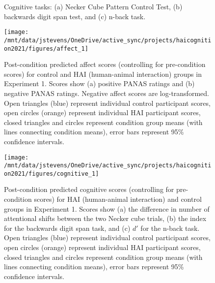 \documentclass[
  english,
  ,doc,floatsintext]{apa6}
\begin{document}
\clearpage
\newpage



\begin{figure}
\hspace{5mm}\newline{}\caption{Cognitive tasks: (a) Necker Cube Pattern Control Test, (b) backwards digit span test, and (c) n-back task.}\label{fig:tasks-fig}
\end{figure}



\begin{figure}
\texttt{[image: /mnt/data/jstevens/OneDrive/active\_sync/projects/haicognition2021/figures/affect\_1]} \caption{Post-condition predicted affect scores (controlling for pre-condition scores) for control and HAI (human-animal interaction) groups in Experiment 1. Scores show (a) positive PANAS ratings and (b) negative PANAS ratings. Negative affect scores are log-transformed. Open triangles (blue) represent individual control participant scores, open circles (orange) represent individual HAI participant scores, closed triangles and circles represent condition group means (with lines connecting condition means), error bars represent 95\% confidence intervals.}\label{fig:affect1}
\end{figure}



\begin{figure}
\texttt{[image: /mnt/data/jstevens/OneDrive/active\_sync/projects/haicognition2021/figures/cognitive\_1]} \caption{Post-condition predicted cognitive scores (controlling for pre-condition scores) for HAI (human-animal interaction) and control groups in Experiment 1. Scores show (a) the difference in number of attentional shifts between the two Necker cube trials, (b) the index for the backwards digit span task, and (c) \(d'\) for the n-back task. Open triangles (blue) represent individual control participant scores, open circles (orange) represent individual HAI participant scores, closed triangles and circles represent condition group means (with lines connecting condition means), error bars represent 95\% confidence intervals.}\label{fig:cognitive1}
\end{figure}
\end{document}
